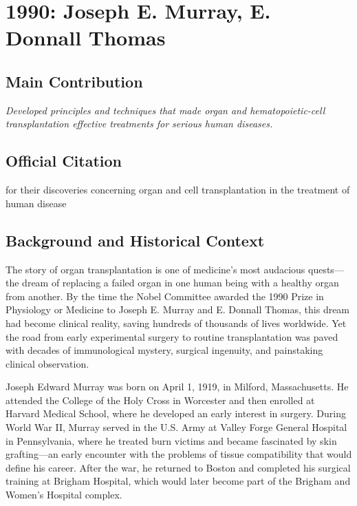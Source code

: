\chapter[1990 --- Murray et al.]{1990: Joseph E. Murray, E. Donnall Thomas}
\label{ch:1990_Murray}

\section*{Main Contribution}

\textit{Developed principles and techniques that made organ and hematopoietic-cell transplantation effective treatments for serious human diseases.}\cite{nobel-1990,lecture-1990}

\section{Official Citation}

for their discoveries concerning organ and cell transplantation in the treatment of human disease

\section{Background and Historical Context}

The story of organ transplantation is one of medicine's most audacious quests---the dream of replacing a failed organ in one human being with a healthy organ from another. By the time the Nobel Committee awarded the 1990 Prize in Physiology or Medicine to Joseph E. Murray and E. Donnall Thomas, this dream had become clinical reality, saving hundreds of thousands of lives worldwide. Yet the road from early experimental surgery to routine transplantation was paved with decades of immunological mystery, surgical ingenuity, and painstaking clinical observation.

Joseph Edward Murray was born on April 1, 1919, in Milford, Massachusetts. He attended the College of the Holy Cross in Worcester and then enrolled at Harvard Medical School, where he developed an early interest in surgery. During World War II, Murray served in the U.S. Army at Valley Forge General Hospital in Pennsylvania, where he treated burn victims and became fascinated by skin grafting---an early encounter with the problems of tissue compatibility that would define his career. After the war, he returned to Boston and completed his surgical training at Brigham Hospital, which would later become part of the Brigham and Women's Hospital complex.

